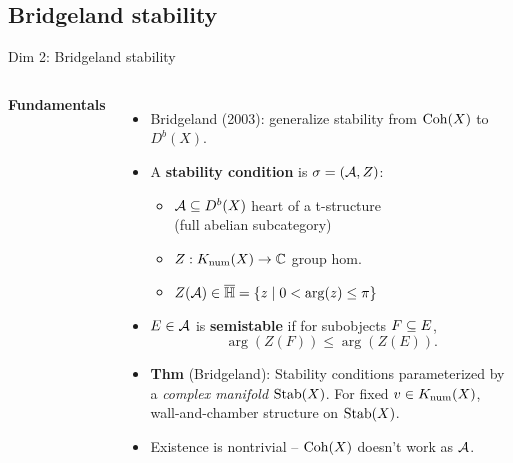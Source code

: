 \documentclass[8pt,handout]{beamer} %
\begin{document}
\subsection{Bridgeland stability}
\begin{frame}{Dim 2: Bridgeland stability}
    \begin{columns}[t]
        \textbf{Fundamentals}
        \begin{itemize}
            \item<2-> Bridgeland (2003): generalize stability from $\mathrm{Coh}(X)$ to $D^b(X)$.
            \item<3-> A \textbf{stability condition} is $\sigma = (\mathcal{A}, Z)$:
            \begin{itemize}
                \item<4-> $\mathcal{A} \subseteq D^b(X)$ heart of a t-structure \\
                \qquad\qquad (full abelian subcategory)
                \item<5-> $Z: K_{\mathrm{num}}(X) \to \mathbb{C}$ group hom.
                \item<6-> $Z(\mathcal{A}) \in \overline{\mathbb{H}} = \{ z \;|\; 0 < \arg(z) \le \pi \}$
            \end{itemize}
            \item<7-> $E \in \mathcal{A}$ is \textbf{semistable} if for subobjects $F \subseteq E$,
            \[ \arg(Z(F)) \le \arg(Z(E)). \]
            \item<8-> \textbf{Thm} (Bridgeland): Stability conditions parameterized by a \textit{complex manifold} $\operatorname{\mathrm{Stab}}(X)$. For fixed $v \in K_{\mathrm{num}}(X)$, wall-and-chamber structure on $\operatorname{\mathrm{Stab}}(X)$.
            \item<9-> Existence is nontrivial -- $\mathrm{Coh}(X)$ doesn't work as $\mathcal{A}$.
        \end{itemize}
        

\end{columns}
\end{frame}
\end{document}
